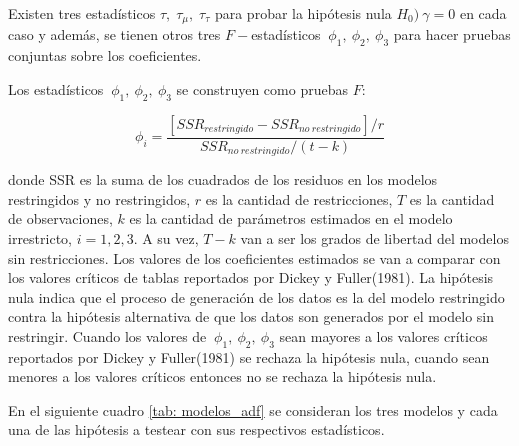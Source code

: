\documentclass[
  oneside]{article}
\begin{document}
Existen tres estadísticos \(\tau,\;\tau_{\mu},\;\tau_{\tau}\) para
probar la hipótesis nula \(H_0)\:\gamma=0\) en cada caso y además, se
tienen otros tres \(F-\)estadísticos \(\:\phi_1,\:\phi_2,\:\phi_3\) para
hacer pruebas conjuntas sobre los coeficientes.

Los estadísticos \(\:\phi_1,\:\phi_2,\:\phi_3\) se construyen como
pruebas \(F\):

\begin{equation*}
    \phi_{i}=\frac{\left[SSR_{restringido}-SSR_{no\:restringido}\right]/r}{SSR_{no\:restringido}/(t-k)}    
\end{equation*}

donde SSR es la suma de los cuadrados de los residuos en los modelos
restringidos y no restringidos, \(r\) es la cantidad de restricciones,
\(T\) es la cantidad de observaciones, \(k\) es la cantidad de
parámetros estimados en el modelo irrestricto, \(i=1,2,3\). A su vez,
\(T-k\) van a ser los grados de libertad del modelos sin restricciones.
Los valores de los coeficientes estimados se van a comparar con los
valores críticos de tablas reportados por Dickey y Fuller(1981). La
hipótesis nula indica que el proceso de generación de los datos es la
del modelo restringido contra la hipótesis alternativa de que los datos
son generados por el modelo sin restringir. Cuando los valores de
\(\:\phi_1,\:\phi_2,\:\phi_3\) sean mayores a los valores críticos
reportados por Dickey y Fuller(1981) se rechaza la hipótesis nula,
cuando sean menores a los valores críticos entonces no se rechaza la
hipótesis nula.

En el siguiente cuadro \ref{tab: modelos_adf} se consideran los tres
modelos y cada una de las hipótesis a testear con sus respectivos
estadísticos.
\end{document}
